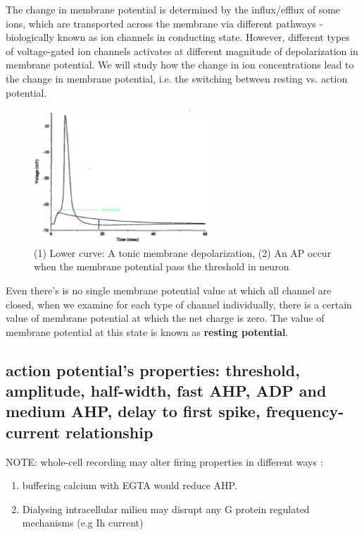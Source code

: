 The change in membrane potential is determined by the influx/efflux of some
ions, which are transported across the membrane via different pathways -
biologically known as ion channels in conducting state. However, different types
of voltage-gated ion channels activates at different magnitude of depolarization
in membrane potential. We will study how the change in ion concentrations lead
to the change in membrane potential, i.e. the switching between resting vs.
action potential.

\begin{figure}[hbt]
  \centerline{\includegraphics[height=5cm,
    angle=0]{./images/AP.eps}}
  \caption{(1) Lower curve: A tonic membrane depolarization, (2) An AP occur
  when the membrane potential pass the threshold in neuron }
  \label{fig:AP}
\end{figure}

Even there's is no single membrane potential value at which all channel are
closed, when we examine for each type of channel individually, there is a
certain value of membrane potential at which the net charge is zero. The value
of membrane potential at this state is known as {\bf resting potential}. 

\subsection{action potential's properties: threshold, amplitude, half-width, fast AHP, ADP
  and medium AHP, delay to first spike, frequency-current relationship}
\label{sec:action-potential-properties}
\label{sec:AP-adaptation}

NOTE: whole-cell recording may alter firing properties in different ways : 
\begin{enumerate}
  \item buffering calcium with EGTA would reduce AHP.
  
  \item Dialysing intracellular milieu may disrupt any G protein regulated
  mechanisms (e.g Ih current)
\end{enumerate}

